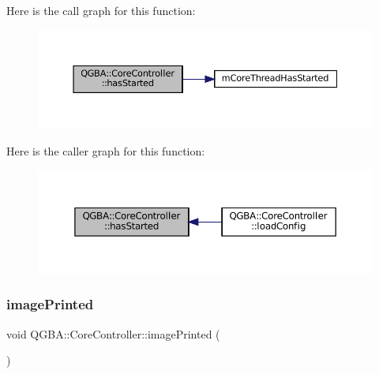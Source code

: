 Here is the call graph for this function\+:
\nopagebreak
\begin{figure}[H]
\begin{center}
\leavevmode
\includegraphics[width=350pt]{class_q_g_b_a_1_1_core_controller_a2ca73e2c7b5111edcf3b137651b3cff4_cgraph}
\end{center}
\end{figure}
Here is the caller graph for this function\+:
\nopagebreak
\begin{figure}[H]
\begin{center}
\leavevmode
\includegraphics[width=350pt]{class_q_g_b_a_1_1_core_controller_a2ca73e2c7b5111edcf3b137651b3cff4_icgraph}
\end{center}
\end{figure}
\mbox{\label{class_q_g_b_a_1_1_core_controller_a130cba4cb7c5d2b98534c9f58cd7ada9}} 
\subsubsection{\texorpdfstring{image\+Printed}{imagePrinted}}
{\footnotesize\ttfamily void Q\+G\+B\+A\+::\+Core\+Controller\+::image\+Printed (\begin{DoxyParamCaption}\item[{const Q\+Image \&}]{ }\end{DoxyParamCaption})\hspace{0.3cm}{\ttfamily [signal]}}


